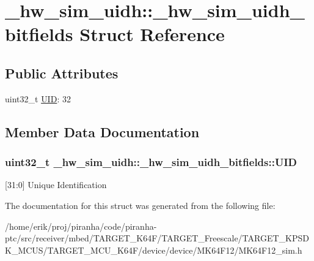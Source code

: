 \hypertarget{struct__hw__sim__uidh_1_1__hw__sim__uidh__bitfields}{}\section{\+\_\+hw\+\_\+sim\+\_\+uidh\+:\+:\+\_\+hw\+\_\+sim\+\_\+uidh\+\_\+bitfields Struct Reference}
\label{struct__hw__sim__uidh_1_1__hw__sim__uidh__bitfields}
\subsection*{Public Attributes}
\begin{DoxyCompactItemize}
\item 
uint32\+\_\+t \hyperlink{struct__hw__sim__uidh_1_1__hw__sim__uidh__bitfields_a50b43b9289733b0ec039dbe37fb529cf}{U\+ID}\+: 32
\end{DoxyCompactItemize}


\subsection{Member Data Documentation}
\subsubsection[{\texorpdfstring{U\+ID}{UID}}]{\setlength{\rightskip}{0pt plus 5cm}uint32\+\_\+t \+\_\+hw\+\_\+sim\+\_\+uidh\+::\+\_\+hw\+\_\+sim\+\_\+uidh\+\_\+bitfields\+::\+U\+ID}\hypertarget{struct__hw__sim__uidh_1_1__hw__sim__uidh__bitfields_a50b43b9289733b0ec039dbe37fb529cf}{}\label{struct__hw__sim__uidh_1_1__hw__sim__uidh__bitfields_a50b43b9289733b0ec039dbe37fb529cf}
\mbox{[}31\+:0\mbox{]} Unique Identification 

The documentation for this struct was generated from the following file\+:\begin{DoxyCompactItemize}
\item 
/home/erik/proj/piranha/code/piranha-\/ptc/src/receiver/mbed/\+T\+A\+R\+G\+E\+T\+\_\+\+K64\+F/\+T\+A\+R\+G\+E\+T\+\_\+\+Freescale/\+T\+A\+R\+G\+E\+T\+\_\+\+K\+P\+S\+D\+K\+\_\+\+M\+C\+U\+S/\+T\+A\+R\+G\+E\+T\+\_\+\+M\+C\+U\+\_\+\+K64\+F/device/device/\+M\+K64\+F12/M\+K64\+F12\+\_\+sim.\+h\end{DoxyCompactItemize}
